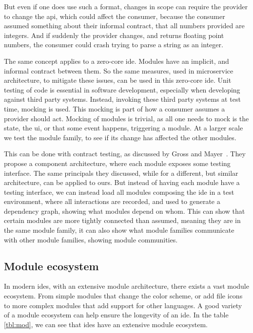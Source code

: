 But even if one does use such a format, changes in scope can require the
provider to change the \gls*{api}, which could affect the consumer, because the
consumer assumed something about their informal contract, that all numbers
provided are integers. And if suddenly the provider changes, and returns
floating point numbers, the consumer could crash trying to parse a string as an
integer.

The same concept applies to a zero-core \gls*{ide}. Modules have an implicit, and
informal contract between them. So the same measures, used in microservice
architecture, to mitigate these issues, can be used in this zero-core \gls*{ide}.
Unit testing of code is essential in software development, especially when
developing against third party systems. Instead, invoking these third party
systems at test time, mocking is used. This mocking is part of how a consumer
assumes a provider should act. Mocking of modules is trivial, as all one needs
to mock is the state, the \gls*{ui}, or that some event happens, triggering a
module. At a larger scale we test the module family, to see if its change has
affected the other modules.

This can be done with contract testing, as discussed by Gross and
Mayer~\cite{GROSS200322}. They propose a component architecture, where each
module exposes some testing interface. The same principals they discussed, while
for a different, but similar architecture, can be applied to ours. But instead
of having each module have a testing interface, we can instead load all modules
composing the \gls*{ide} in a test environment, where all interactions are
recorded, and used to generate a dependency graph, showing what modules depend
on whom. This can show that certain modules are more tightly connected than
assumed, meaning they are in the same module family, it can also show what
module families communicate with other module families, showing module
communities.


\subsection{Module ecosystem}

In modern \gls*{ide}s, with an extensive module architecture, there exists a
vast module ecosystem. From simple modules that change the color scheme, or
add file icons to more complex modules that add support for other languages.
A good variety of a module ecosystem can help ensure the longevity of an
\gls*{ide}. In the table \ref{tbl:mod}, we can see that \gls*{ide}s have an
extensive module ecosystem.\footnotemark{}

